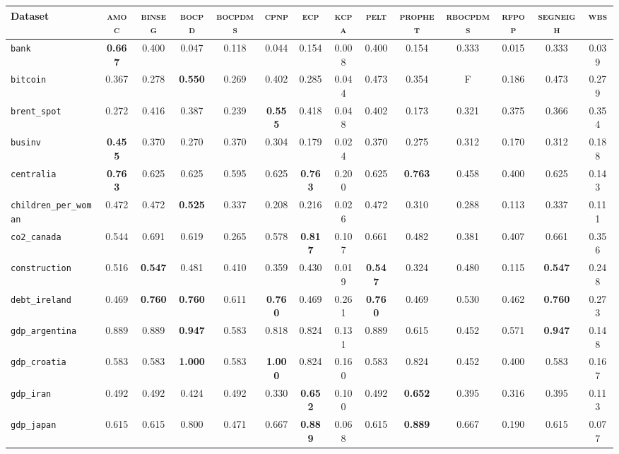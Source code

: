 \begin{tabular}{lccccccccccccc}
Dataset & \textsc{amoc} & \textsc{binseg} & \textsc{bocpd} & \textsc{bocpdms} & \textsc{cpnp} & \textsc{ecp} & \textsc{kcpa} & \textsc{pelt} & \textsc{prophet} & \textsc{rbocpdms} & \textsc{rfpop} & \textsc{segneigh} & \textsc{wbs}\\
\hline
\verb+bank+ & \textbf{0.667} & 0.400 & 0.047 & 0.118 & 0.044 & 0.154 & 0.008 & 0.400 & 0.154 & 0.333 & 0.015 & 0.333 & 0.039\\
\verb+bitcoin+ & 0.367 & 0.278 & \textbf{0.550} & 0.269 & 0.402 & 0.285 & 0.044 & 0.473 & 0.354 & F & 0.186 & 0.473 & 0.279\\
\verb+brent_spot+ & 0.272 & 0.416 & 0.387 & 0.239 & \textbf{0.555} & 0.418 & 0.048 & 0.402 & 0.173 & 0.321 & 0.375 & 0.366 & 0.354\\
\verb+businv+ & \textbf{0.455} & 0.370 & 0.270 & 0.370 & 0.304 & 0.179 & 0.024 & 0.370 & 0.275 & 0.312 & 0.170 & 0.312 & 0.188\\
\verb+centralia+ & \textbf{0.763} & 0.625 & 0.625 & 0.595 & 0.625 & \textbf{0.763} & 0.200 & 0.625 & \textbf{0.763} & 0.458 & 0.400 & 0.625 & 0.143\\
\verb+children_per_woman+ & 0.472 & 0.472 & \textbf{0.525} & 0.337 & 0.208 & 0.216 & 0.026 & 0.472 & 0.310 & 0.288 & 0.113 & 0.337 & 0.111\\
\verb+co2_canada+ & 0.544 & 0.691 & 0.619 & 0.265 & 0.578 & \textbf{0.817} & 0.107 & 0.661 & 0.482 & 0.381 & 0.407 & 0.661 & 0.356\\
\verb+construction+ & 0.516 & \textbf{0.547} & 0.481 & 0.410 & 0.359 & 0.430 & 0.019 & \textbf{0.547} & 0.324 & 0.480 & 0.115 & \textbf{0.547} & 0.248\\
\verb+debt_ireland+ & 0.469 & \textbf{0.760} & \textbf{0.760} & 0.611 & \textbf{0.760} & 0.469 & 0.261 & \textbf{0.760} & 0.469 & 0.530 & 0.462 & \textbf{0.760} & 0.273\\
\verb+gdp_argentina+ & 0.889 & 0.889 & \textbf{0.947} & 0.583 & 0.818 & 0.824 & 0.131 & 0.889 & 0.615 & 0.452 & 0.571 & \textbf{0.947} & 0.148\\
\verb+gdp_croatia+ & 0.583 & 0.583 & \textbf{1.000} & 0.583 & \textbf{1.000} & 0.824 & 0.160 & 0.583 & 0.824 & 0.452 & 0.400 & 0.583 & 0.167\\
\verb+gdp_iran+ & 0.492 & 0.492 & 0.424 & 0.492 & 0.330 & \textbf{0.652} & 0.100 & 0.492 & \textbf{0.652} & 0.395 & 0.316 & 0.395 & 0.113\\
\verb+gdp_japan+ & 0.615 & 0.615 & 0.800 & 0.471 & 0.667 & \textbf{0.889} & 0.068 & 0.615 & \textbf{0.889} & 0.667 & 0.190 & 0.615 & 0.077\\

\end{tabular}
